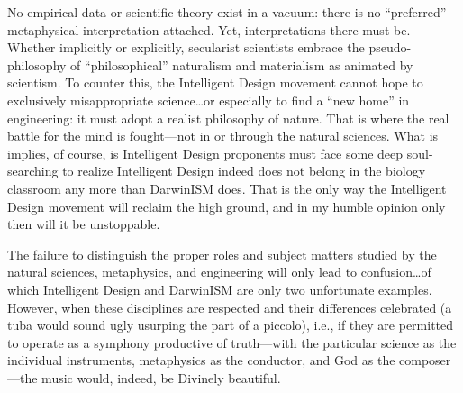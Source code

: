 No empirical data or scientific theory exist in a vacuum: there is no ``preferred'' metaphysical interpretation attached. Yet, interpretations there must be. Whether implicitly or explicitly, secularist scientists embrace the pseudo-philosophy of ``philosophical'' naturalism and materialism as animated by scientism. To counter this, the Intelligent Design movement cannot hope to exclusively misappropriate science\ldots or especially to find a ``new home'' in engineering: it must adopt a realist philosophy of nature. That is where the real battle for the mind is fought---not in or through the natural sciences. What is implies, of course, is Intelligent Design proponents must face some deep soul-searching to realize Intelligent Design indeed does not belong in the biology classroom any more than DarwinISM does. That is the only way the Intelligent Design movement will reclaim the high ground, and in my humble opinion only then will it be unstoppable.

The failure to distinguish the proper roles and subject matters studied by the natural sciences, metaphysics, and engineering will only lead to confusion\ldots of which Intelligent Design and DarwinISM are only two unfortunate examples. However, when these disciplines are respected and their differences celebrated (a tuba would sound ugly usurping the part of a piccolo), i.e., if they are permitted to operate as a symphony productive of truth---with the particular science as the individual instruments, metaphysics as the conductor, and God as the composer---the music would, indeed, be Divinely beautiful.



